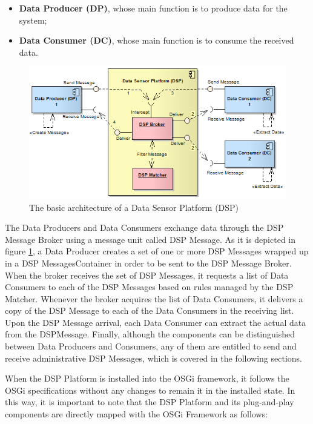 \begin{itemize}
  \item \textbf{Data Producer (DP)}, whose main function is to produce data for
  the system;
  \item \textbf{Data Consumer (DC)}, whose main function is to consume the
  received data.
\end{itemize}

\begin{figure}[!b]
  \centering
  \includegraphics[scale=0.7]{../diagrams/DSP-Producers-Consumers-Components-Interactions}
  \caption{The basic architecture of a Data Sensor Platform (DSP)}
  \label{fig:DSP-Producers-Consumers-Components-Interactions}
\end{figure}

The Data Producers and Data Consumers exchange data through the DSP Message
Broker using a message unit called DSP Message. As it is depicted in figure
\ref{fig:DSP-Producers-Consumers-Components-Interactions}, a Data Producer
creates a set of one or more DSP Messages wrapped up in a DSP
MessagesContainer in order to be sent to the DSP Message Broker. When the
broker receives the set of DSP Messages, it requests a list of Data Consumers
to each of the DSP Messages based on rules managed by the DSP Matcher.
Whenever the broker acquires the list of Data Consumers, it delivers a copy of
the DSP Message to each of the Data Consumers in the receiving list. Upon the
DSP Message arrival, each Data Consumer can extract the actual data from the
DSPMessage. Finally, although the components can be distinguished between Data
Producers and Consumers, any of them are entitled to send and receive
administrative DSP Messages, which is covered in the following sections.

When the DSP Platform is installed into the OSGi framework, it follows the
OSGi specifications without any changes to remain it in the installed state.
In this way, it is important to note that the DSP Platform and its
plug-and-play components are directly mapped with the OSGi Framework as
follows:

